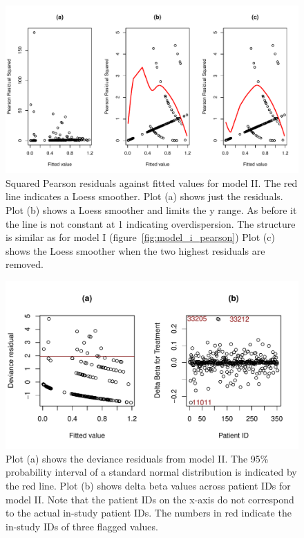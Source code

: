 \documentclass[paper=a4, fontsize=11pt]{scrartcl} %
\numberwithin{equation}{section} %
\numberwithin{figure}{section} %
\numberwithin{table}{section} %
\begin{document}
\captionsetup{width=.9\textwidth}
\begin{figure}[H]
\centering
\includegraphics[width=.9\textwidth]{./rcode/plots/model_ii_pearson}
\caption{Squared Pearson residuals against fitted values for model II. The red line indicates a Loess smoother. Plot (a) shows just the residuals. Plot (b) shows a Loess smoother and limits the y range. As before it the line is not constant at 1 indicating overdispersion. The structure is similar as for model I (figure~\ref{fig:model_i_pearson}) Plot (c) shows the Loess smoother when the two highest residuals are removed.}
\label{fig:model_ii_pearson}
\end{figure}
\begin{figure}[H]
\centering
\includegraphics[width=.9\textwidth]{./rcode/plots/model_ii_diagnostics}
\caption{Plot (a) shows the deviance residuals from model II. The 95\% probability interval of a standard normal distribution is indicated by the red line. Plot (b) shows delta beta values across patient IDs for model II. Note that the patient IDs on the x-axis do not correspond to the actual in-study patient IDs. The numbers in red indicate the in-study IDs of three flagged values.}
\label{fig:model_ii_diagnostics}
\end{figure}
\end{document}
